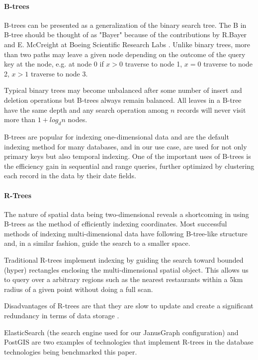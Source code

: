 \paragraph{B-trees}
B-trees can be presented as a generalization of the binary search tree. The B in B-tree should be thought of as "Bayer" because of the contributions by R.Bayer and E. McCreight at Boeing Scientific Research Labs \cite{btree}. Unlike binary trees, more than two paths may leave a given node depending on the outcome of the query key at the node, e.g. at node 0 if $x>0$ traverse to node 1, $x=0$ traverse to node 2, $x>1$ traverse to node 3.

Typical binary trees may become unbalanced after some number of insert and deletion operations but B-trees always remain balanced. All leaves in a B-tree have the same depth and any search operation among $n$ records will never visit more than $1 + log_dn$ nodes.

B-trees are popular for indexing one-dimensional data and are the default indexing method for many databases, and in our use case, are used for not only primary keys but also temporal indexing. One of the important uses of B-trees is the efficiency gain in sequential and range queries, further optimized by clustering each record in the data by their date fields.

\paragraph{R-Trees}

The nature of spatial data being two-dimensional reveals a shortcoming in using B-trees as the method of efficiently indexing coordinates. Most successful methods of indexing multi-dimensional data have following B-tree-like structure \cite{rtree} and, in a similar fashion, guide the search to a smaller space.

Traditional R-trees implement indexing by guiding the search toward bounded (hyper) rectangles enclosing the multi-dimensional spatial object. This allows us to query over a arbitrary regions such as the nearest restaurants within a 5km radius of a given point without doing a full scan.

Disadvantages of R-trees are that they are slow to update and create a significant redundancy in terms of data storage \cite{graphgurus}.

ElasticSearch (the search engine used for our JanusGraph configuration) and PostGIS are two examples of technologies that implement R-trees in the database technologies being benchmarked this paper.

